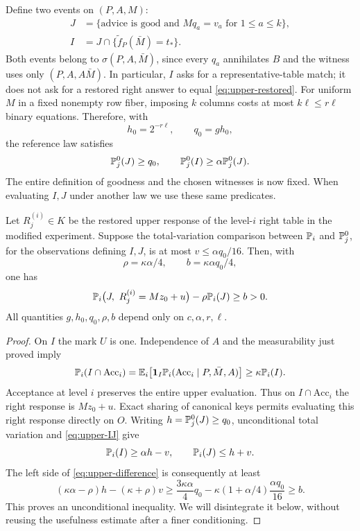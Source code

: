 Define two events on $(P,A,M)$:
\begin{align*}
 J&=\{\text{advice is good and }Mq_a=v_a\text{ for }1\le a\le k\},\\
 I&=J\cap\{\widetilde f_P(\bar M)=t_*\}.
\end{align*}
Both events belong to $\sigma(P,A,\bar M)$, since every $q_a$ annihilates
$B$ and the witness uses only $(P,A,A\bar M)$.  In particular, $I$ asks
for a representative-table match; it does not ask for a restored right
answer to equal \eqref{eq:upper-restored}.
For uniform $M$ in a fixed nonempty row fiber, imposing $k$ columns costs
at most $k\ell\le r\ell$ binary equations.  Therefore, with
\begin{equation}\label{eq:upper-q0}
 h_0=2^{-r\ell},\qquad q_0=gh_0,
\end{equation}
the reference law satisfies
\begin{equation}\label{eq:upper-IJ}
 \mathbb P_j^0(J)\ge q_0,\qquad
 \mathbb P_j^0(I)\ge\alpha\mathbb P_j^0(J).
\end{equation}
The entire definition of goodness and the chosen witnesses is now fixed.
When evaluating $I,J$ under another law we use these same predicates.

\begin{lemma}
\label{lem:positive-difference}
Let $R_j^{(i)}\in K$ be the restored upper response of the level-$i$ right
table in the modified experiment.  Suppose the total-variation comparison
between $\mathbb P_i$ and $\mathbb P_j^0$, for the observations defining $I,J$, is
at most $v\le\alpha q_0/16$.  Then, with
\[
 \rho=\kappa\alpha/4,\qquad b=\kappa\alpha q_0/4,
\]
one has
\begin{equation}\label{eq:upper-difference}
 \mathbb P_i\bigl(J,\ R_j^{(i)}=Mz_0+u\bigr)-\rho\mathbb P_i(J)\ge b>0.
\end{equation}
All quantities $g,h_0,q_0,\rho,b$ depend only on $c,\alpha,r,\ell$.
\end{lemma}

\begin{proof}
On $I$ the mark $U$ is one.  Independence of $A$ and the measurability
just proved imply
\[
 \mathbb P_i(I\cap \mathrm{Acc}_i)
 =\mathbb E_i\bigl[\mathbf 1_I\mathbb P_i(\mathrm{Acc}_i\mid P,\bar M,A)\bigr]
 \ge\kappa\mathbb P_i(I).
\]
Acceptance at level $i$ preserves the entire upper evaluation.  Thus on
$I\cap \mathrm{Acc}_i$ the right response is $Mz_0+u$.  Exact sharing of canonical
keys permits evaluating this right response directly on $O$.
Writing $h=\mathbb P_j^0(J)\ge q_0$, unconditional total variation and
\eqref{eq:upper-IJ} give
\[
 \mathbb P_i(I)\ge\alpha h-v,\qquad \mathbb P_i(J)\le h+v.
\]
The left side of \eqref{eq:upper-difference} is consequently at least
\[
 (\kappa\alpha-\rho)h-(\kappa+\rho)v
 \ge\frac{3\kappa\alpha}{4}q_0
      -\kappa(1+\alpha/4)\frac{\alpha q_0}{16}
 \ge b.
\]
This proves an unconditional inequality.  We will disintegrate it below,
without reusing the usefulness estimate after a finer conditioning.
\end{proof}

